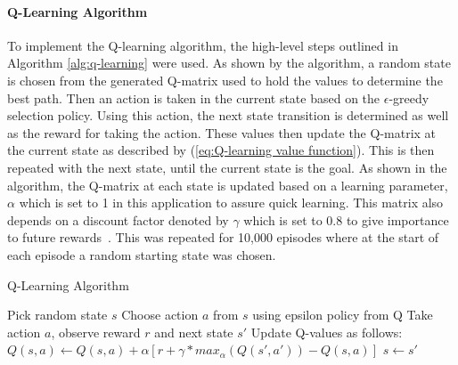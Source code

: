 \documentclass[12pt,american]{report}
\begin{document}
\paragraph{Q-Learning Algorithm}
To implement the Q-learning algorithm, the high-level steps outlined in Algorithm \ref{alg:q-learning} were used.  As shown by the algorithm, a random state is chosen from the generated Q-matrix used to hold the values to determine the best path.  Then an action is taken in the current state based on the \begin{math}\epsilon\end{math}-greedy selection policy.  Using this action, the next state transition is determined as well as the reward for taking the action.  These values then update the Q-matrix at the current state as described by (\ref{eq:Q-learning value function}). This is then repeated with the next state, until the current state is the goal. As shown in the algorithm, the Q-matrix at each state is updated based on a learning parameter, \begin{math}\alpha\end{math} which is set to 1 in this application to assure quick learning. This matrix also depends on a discount factor denoted by \begin{math}\gamma\end{math} which is set to 0.8 to give importance to future rewards~\cite{Eden}. This was repeated for 10,000 episodes where at the start of each episode a random starting state was chosen. 

\begin{algorithm}
\caption{Q-Learning Algorithm~\cite{Eden}}
\label{alg:q-learning}
\begin{algorithmic} 
\State Pick random state $s$
\State Choose action $a$ from $s$ using epsilon policy from Q
\State Take action $a$, observe reward $r$ and next state $s'$
\State Update Q-values as follows:
\State $Q(s,a) \leftarrow Q(s,a) + \alpha [r+ \gamma*max_{\alpha}(Q(s',a')) - Q(s,a)] $
\State $s \leftarrow s'$
\EndWhile
\EndFor
\end{algorithmic}
\end{algorithm}
\end{document}
